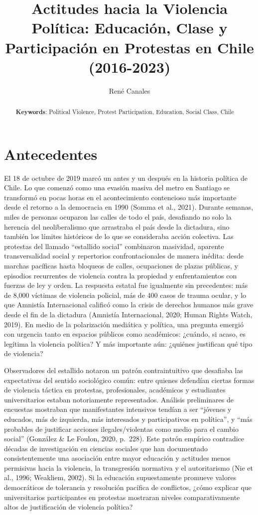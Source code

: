 \documentclass[
  12pt,
]{article}
\title{Actitudes hacia la Violencia Política: Educación, Clase y
Participación en Protestas en Chile (2016-2023)}
\author{René Canales}
\date{}
\begin{document}
\maketitle
\begin{abstract}
\textbf{Keywords}: Political Violence, Protest Participation, Education,
Social Class, Chile
\end{abstract}


\section{Antecedentes}\label{antecedentes}

El 18 de octubre de 2019 marcó un antes y un después en la historia
política de Chile. Lo que comenzó como una evasión masiva del metro en
Santiago se transformó en pocas horas en el acontecimiento contencioso
más importante desde el retorno a la democracia en 1990 (Somma et al.,
2021). Durante semanas, miles de personas ocuparon las calles de todo el
país, desafiando no solo la herencia del neoliberalismo que arrastraba
el país desde la dictadura, sino también los límites históricos de lo
que se consideraba acción colectiva. Las protestas del llamado
``estallido social'' combinaron masividad, aparente transversalidad
social y repertorios confrontacionales de manera inédita: desde marchas
pacíficas hasta bloqueos de calles, ocupaciones de plazas públicas, y
episodios recurrentes de violencia contra la propiedad y enfrentamientos
con fuerzas de ley y orden. La respuesta estatal fue igualmente sin
precedentes: más de 8,000 víctimas de violencia policial, más de 400
casos de trauma ocular, y lo que Amnistía Internacional calificó como la
crisis de derechos humanos más grave desde el fin de la dictadura
(Amnistía Internacional, 2020; Human Rights Watch, 2019). En medio de la
polarización mediática y política, una pregunta emergió con urgencia
tanto en espacios públicos como académicos: ¿cuándo, si acaso, es
legítima la violencia política? Y más importante aún: ¿quiénes
justifican qué tipo de violencia?

Observadores del estallido notaron un patrón contraintuitivo que
desafiaba las expectativas del sentido sociológico común: entre quienes
defendían ciertas formas de violencia táctica en protestas,
profesionales, académicos y estudiantes universitarios estaban
notoriamente representados. Análisis preliminares de encuestas mostraban
que manifestantes intensivos tendían a ser ``jóvenes y educados, más de
izquierda, más interesados y participativos en política'', y ``más
probables de justificar acciones ilegales/violentas como medio para el
cambio social'' (González \& Le Foulon, 2020, p.~228). Este patrón
empírico contradice décadas de investigación en ciencias sociales que
han documentado consistentemente una asociación entre mayor educación y
actitudes menos permisivas hacia la violencia, la transgresión normativa
y el autoritarismo (Nie et al., 1996; Weakliem, 2002). Si la educación
supuestamente promueve valores democráticos de tolerancia y resolución
pacífica de conflictos, ¿cómo explicar que universitarios participantes
en protestas mostraran niveles comparativamente altos de justificación
de violencia política?
\end{document}

